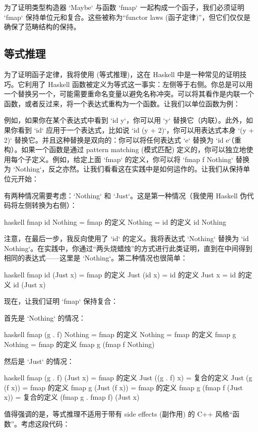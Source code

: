 为了证明类型构造器 `Maybe` 与函数 `fmap` 一起构成一个函子，我们必须证明 `fmap` 保持单位元和复合。这些被称为“functor laws (函子定律)”，但它们仅仅是确保了范畴结构的保持。

\subsection{等式推理}

为了证明函子定律，我将使用  (等式推理)，这在 Haskell 中是一种常见的证明技巧。它利用了 Haskell 函数被定义为等式这一事实：左侧等于右侧。你总是可以用一个替换另一个，可能需要重命名变量以避免名称冲突。可以将其看作是内联一个函数，或者反过来，将一个表达式重构为一个函数。让我们以单位函数为例：

例如，如果你在某个表达式中看到 `id y`，你可以用 `y` 替换它（内联）。此外，如果你看到 `id` 应用于一个表达式，比如说 `id (y + 2)`，你可以用表达式本身 `(y + 2)` 替换它。并且这种替换是双向的：你可以将任何表达式 `e` 替换为 `id e`（重构）。如果一个函数是通过 pattern matching (模式匹配) 定义的，你可以独立地使用每个子定义。例如，给定上面 `fmap` 的定义，你可以将 `fmap f Nothing` 替换为 `Nothing`，反之亦然。让我们看看这在实践中是如何运作的。让我们从保持单位元开始：

有两种情况需要考虑：`Nothing` 和 `Just`。这是第一种情况（我使用 Haskell 伪代码将左侧转换为右侧）：

\begin{snip}{haskell}
  fmap id Nothing
= { fmap 的定义 }
  Nothing
= { id 的定义 }
  id Nothing
\end{snip}
注意，在最后一步，我反向使用了 `id` 的定义。我将表达式 `Nothing` 替换为 `id Nothing`。在实践中，你通过“两头烧蜡烛”的方式进行此类证明，直到在中间得到相同的表达式——这里是 `Nothing`。第二种情况也很简单：

\begin{snip}{haskell}
  fmap id (Just x)
= { fmap 的定义 }
  Just (id x)
= { id 的定义 }
  Just x
= { id 的定义 }
  id (Just x)
\end{snip}
现在，让我们证明 `fmap` 保持复合：

首先是 `Nothing` 的情况：

\begin{snip}{haskell}
  fmap (g . f) Nothing
= { fmap 的定义 }
  Nothing
= { fmap 的定义 }
  fmap g Nothing
= { fmap 的定义 }
  fmap g (fmap f Nothing)
\end{snip}
然后是 `Just` 的情况：

\begin{snip}{haskell}
  fmap (g . f) (Just x)
= { fmap 的定义 }
  Just ((g . f) x)
= { 复合的定义 }
  Just (g (f x))
= { fmap 的定义 }
  fmap g (Just (f x))
= { fmap 的定义 }
  fmap g (fmap f (Just x))
= { 复合的定义 }
  (fmap g . fmap f) (Just x)
\end{snip}
值得强调的是，等式推理不适用于带有 side effects (副作用) 的 C++ 风格“函数”。考虑这段代码：

